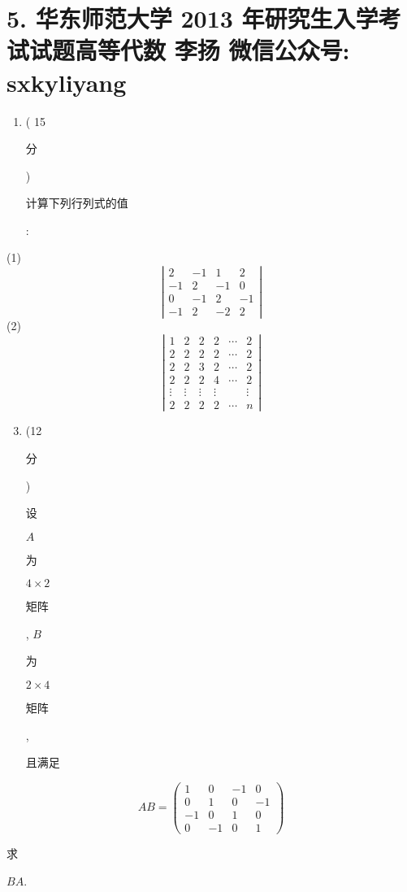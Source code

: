 \documentclass[10pt]{article}
\begin{document}
\section{5. 华东师范大学 2013 年研究生入学考试试题高等代数 
 李扬 
 微信公众号: sxkyliyang}
\begin{enumerate}
  \item ( 15 \begin{CJK}{UTF8}{mj}分\end{CJK}) \begin{CJK}{UTF8}{mj}计算下列行列式的值\end{CJK}:
\end{enumerate}
(1)
$$
\left|\begin{array}{cccc}
2 & -1 & 1 & 2 \\
-1 & 2 & -1 & 0 \\
0 & -1 & 2 & -1 \\
-1 & 2 & -2 & 2
\end{array}\right|
$$
(2)
$$
\left|\begin{array}{cccccc}
1 & 2 & 2 & 2 & \cdots & 2 \\
2 & 2 & 2 & 2 & \cdots & 2 \\
2 & 2 & 3 & 2 & \cdots & 2 \\
2 & 2 & 2 & 4 & \cdots & 2 \\
\vdots & \vdots & \vdots & \vdots & & \vdots \\
2 & 2 & 2 & 2 & \cdots & n
\end{array}\right|
$$

\begin{enumerate}
  \setcounter{enumi}{2}
  \item (12 \begin{CJK}{UTF8}{mj}分\end{CJK}) \begin{CJK}{UTF8}{mj}设\end{CJK} $A$ \begin{CJK}{UTF8}{mj}为\end{CJK} $4 \times 2$ \begin{CJK}{UTF8}{mj}矩阵\end{CJK}, $B$ \begin{CJK}{UTF8}{mj}为\end{CJK} $2 \times 4$ \begin{CJK}{UTF8}{mj}矩阵\end{CJK}, \begin{CJK}{UTF8}{mj}且满足\end{CJK}
\end{enumerate}
$$
A B=\left(\begin{array}{cccc}
1 & 0 & -1 & 0 \\
0 & 1 & 0 & -1 \\
-1 & 0 & 1 & 0 \\
0 & -1 & 0 & 1
\end{array}\right)
$$
\begin{CJK}{UTF8}{mj}求\end{CJK} $B A$.
\end{document}
